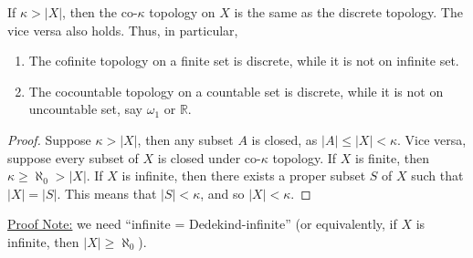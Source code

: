 \documentclass{treatise}
\begin{document}
\begin{proposition}
If $\kappa > |X|$, then the co-$\kappa$ topology on $X$ is the same as the discrete topology. The vice versa also holds. Thus, in particular,
\begin{enumerate}
    \item The cofinite topology on a finite set is discrete, while it is not on infinite set.
    \item The cocountable topology on a countable set is discrete, while it is not on uncountable set, say $\omega_1$ or $\mathbb{R}$.
\end{enumerate}
\end{proposition}
\begin{proof}
Suppose $\kappa > |X|$, then any subset $A$ is closed, as $|A| \leq |X| < \kappa$. Vice versa, suppose every subset of $X$ is closed under co-$\kappa$ topology. If $X$ is finite, then $\kappa \geq \aleph_0 > |X|$. If $X$ is infinite, then there exists a proper subset $S$ of $X$ such that $|X| = |S|$. This means that $|S| < \kappa$, and so $|X| < \kappa$.
\end{proof}
\underline{Proof Note:} we need ``infinite = Dedekind-infinite'' (or equivalently, if $X$ is infinite, then $|X| \geq \aleph_0$).
\end{document}
